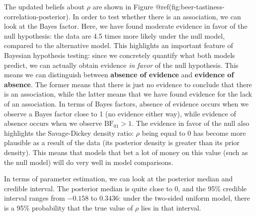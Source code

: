 \documentclass[
  letterpaper,
  DIV=11,
  numbers=noendperiod]{scrreprt}
\begin{document}
The updated beliefs about \(\rho\) are shown in Figure
@ref(fig:beer-tastiness-correlation-posterior). In order to test whether
there is an association, we can look at the Bayes factor. Here, we have
found moderate evidence in favor of the null hypothesis: the data are
4.5 times more likely under the null model, compared to the alternative
model. This highlights an important feature of Bayesian hypothesis
testing: since we concretely quantify what both models predict, we can
actually obtain evidence \emph{in favor} of the null hypothesis. This
means we can distinguish between \textbf{absence of evidence} and
\textbf{evidence of absence}. The former means that there is just no
evidence to conclude that there is an association, while the latter
means that we have found evidence for the lack of an association. In
terms of Bayes factors, absence of evidence occurs when we observe a
Bayes factor close to 1 (no evidence either way), while evidence of
absence occurs when we observe \(\text{BF}_{01} > 1\). The evidence in
favor of the null also highlights the Savage-Dickey density ratio:
\(\rho\) being equal to 0 has become more plausible as a result of the
data (its posterior density is greater than its prior density). This
means that models that bet a lot of money on this value (such as the
null model) will do very well in model comparisons.

In terms of parameter estimation, we can look at the posterior median
and credible interval. The posterior median is quite close to 0, and the
95\% credible interval ranges from \(-0.158\) to \(0.3436\): under the
two-sided uniform model, there is a 95\% probability that the true value
of \(\rho\) lies in that interval.
\end{document}
